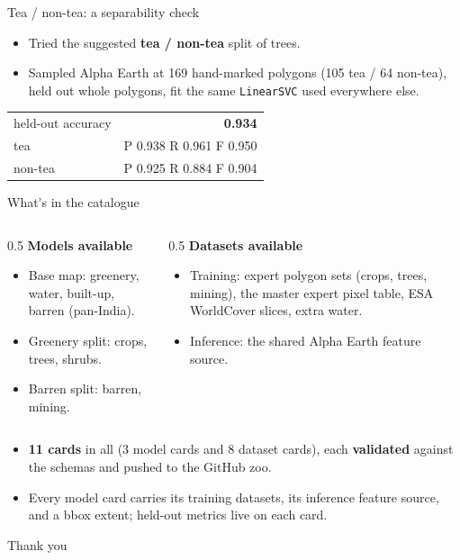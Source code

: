 \documentclass[aspectratio=169]{beamer}
\begin{document}
\begin{frame}{Tea / non-tea: a separability check}
\begin{itemize}
  \item Tried the suggested \textbf{tea / non-tea} split of trees.
  \item Sampled Alpha Earth at 169 hand-marked polygons (105 tea / 64 non-tea), held out whole
  polygons, fit the same \texttt{LinearSVC} used everywhere else.
\end{itemize}
\vspace{0.3em}
\begin{center}\small
\begin{tabular}{@{}lr@{}}
\toprule
held-out accuracy & \textbf{0.934} \\
tea  & P 0.938 \quad R 0.961 \quad F 0.950 \\
non-tea & P 0.925 \quad R 0.884 \quad F 0.904 \\
\bottomrule
\end{tabular}
\end{center}
\end{frame}

\begin{frame}{What's in the catalogue}
\begin{columns}[T]
\begin{column}{0.5\textwidth}
\textbf{Models available}
\begin{itemize}\small
  \item Base map: greenery, water, built-up, barren (pan-India).
  \item Greenery split: crops, trees, shrubs.
  \item Barren split: barren, mining.
\end{itemize}
\end{column}
\begin{column}{0.5\textwidth}
\textbf{Datasets available}
\begin{itemize}\small
  \item Training: expert polygon sets (crops, trees, mining), the master expert pixel table,
  ESA WorldCover slices, extra water.
  \item Inference: the shared Alpha Earth feature source.
\end{itemize}
\end{column}
\end{columns}
\vspace{0.6em}
\begin{itemize}\footnotesize
  \item \textbf{11 cards} in all (3 model cards and 8 dataset cards), each \textbf{validated} against
  the schemas and pushed to the GitHub zoo.
  \item Every model card carries its training datasets, its inference feature source, and a bbox
  extent; held-out metrics live on each card.
\end{itemize}
\end{frame}

\begin{frame}
\centering
\Large Thank you
\end{frame}
\end{document}
